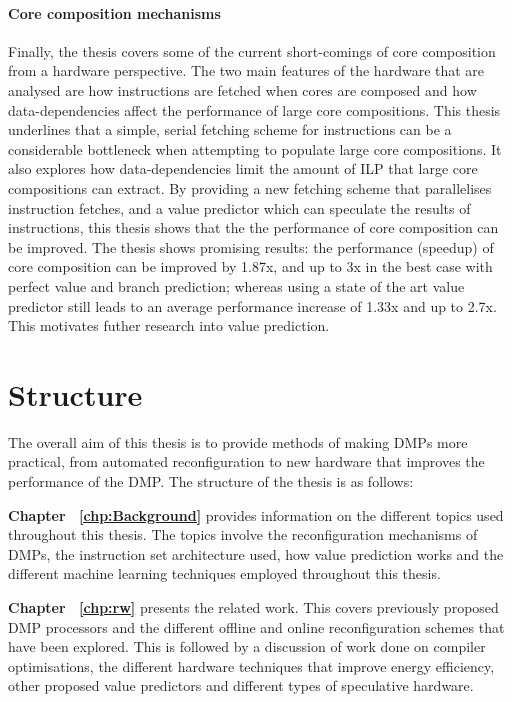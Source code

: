 \paragraph*{Core composition mechanisms} 
Finally, the thesis covers some of the current short-comings of core composition from a hardware perspective.
The two main features of the hardware that are analysed are how instructions are fetched when cores are composed and how data-dependencies affect the performance of large core compositions.
This thesis underlines that a simple, serial fetching scheme for instructions can be a considerable bottleneck when attempting to populate large core compositions.
It also explores how data-dependencies limit the amount of ILP that large core compositions can extract.
By providing a new fetching scheme that parallelises instruction fetches, and a value predictor which can speculate the results of instructions, this thesis shows that the the performance of core composition can be improved.
The thesis shows promising results: the performance (speedup) of core composition can be improved by 1.87x, and up to 3x in the best case with perfect value and branch prediction; whereas using a state of the art value predictor still leads to an average performance increase of 1.33x and up to 2.7x.
This motivates futher research into value prediction.

\section{Structure}
The overall aim of this thesis is to provide methods of making DMPs more practical, from automated reconfiguration to new hardware that improves the performance of the DMP.
The structure of the thesis is as follows:

\textbf{Chapter ~\ref{chp:Background}} provides information on the different topics used throughout this thesis. The topics involve the reconfiguration mechanisms of DMPs, the instruction set architecture used, how value prediction works and the different machine learning techniques employed throughout this thesis.

\textbf{Chapter ~\ref{chp:rw}} presents the related work. This covers previously proposed DMP processors and the different offline and online reconfiguration schemes that have been explored. 
This is followed by a discussion of work done on compiler optimisations, the different hardware techniques that improve energy efficiency, other proposed value predictors and different types of speculative hardware.

